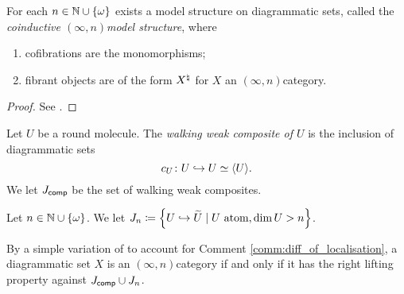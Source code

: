 \begin{prop} \label{prop:model_structre_on_marked_dgm_set}
    For each \( n \in \mathbb{N} \cup \left\{ {\omega} \right\} \) exists a model structure on diagrammatic sets, called the \emph{coinductive \( (\infty, n) \)\nbd model structure}, where
    \begin{enumerate}
        \item cofibrations are the monomorphisms;
        \item fibrant objects are of the form \( {X}^{\natural} \) for \( X \) an \( (\infty, n) \)\nbd category.
    \end{enumerate}
\end{prop}
\begin{proof}
    See \cite[3.24, Theorem 4.9]{chanavat2024model}.
\end{proof}

\begin{dfn}
    Let \( U \) be a round molecule.
    The \emph{walking weak composite of \( U \)} is the inclusion of diagrammatic sets
    \begin{equation*}
        c_U \colon U \hookrightarrow U \simeq \langle U\rangle.
    \end{equation*}
    We let \( J_{\mathsf{comp}} \) be the set of walking weak composites.
\end{dfn}

\begin{dfn}
    Let \( n \in \mathbb{N} \cup \left\{ {\omega} \right\} \).
    We let \( J_{n} \coloneqq \left\{ {U \hookrightarrow \widetilde{U} \mid U \text{ atom}, \dim U > n } \right\} \).
\end{dfn}

\begin{rmk} \label{rmk:infty_n_cat_iff_rlp_Jcomp_Jn}
    By a simple variation of \cite[Proposition 3.8, Proposition 3.9]{chanavat2024model} to account for Comment \ref{comm:diff_of_localisation}, a diagrammatic set \( X \) is an \( (\infty, n) \)\nbd category if and only if it has the right lifting property against \( J_{\mathsf{comp}} \cup J_{n} \).
\end{rmk}

